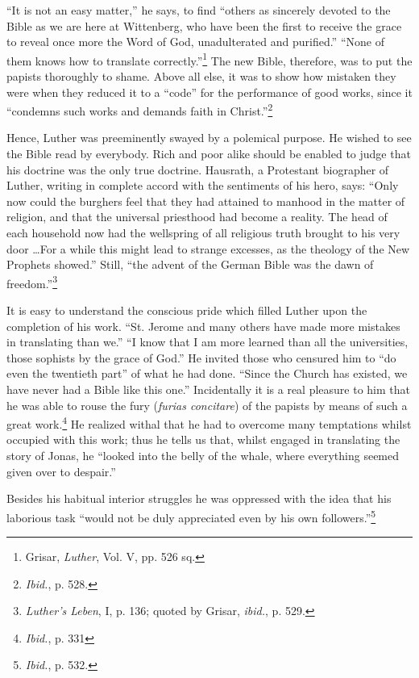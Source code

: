 “It is not an easy matter,” he says, to find “others as sincerely devoted
to the Bible as we are here at Wittenberg, who have been the first to receive
the grace to reveal once more the Word of God, unadulterated and purified.”
“None of them knows how to translate correctly.”\footnote{Grisar, \textit{Luther}, Vol. V, pp. 526 sq.}
 The new Bible, therefore,
was to put the papists thoroughly to shame. Above all else, it was to
show how mistaken they were when they reduced it to a “code” for the
performance of good works, since it “condemns such works and demands
faith in Christ.”\footnote{\textit{Ibid.}, p. 528.}

Hence, Luther was preeminently swayed by a polemical purpose. He
wished to see the Bible read by everybody. Rich and poor alike should be
enabled to judge that his doctrine was the only true doctrine. Hausrath,
a Protestant biographer of Luther, writing in complete accord with the
sentiments of his hero, says: “Only now could the burghers feel that they
had attained to manhood in the matter of religion, and that the universal
priesthood had become a reality. The head of each household now had the
wellspring of all religious truth brought to his very door \dots For a while
this might lead to strange excesses, as the theology of the New Prophets
showed.” Still, “the advent of the German Bible was the dawn of freedom.”\footnote{\textit{Luther’s Leben}, I, p. 136; quoted by Grisar, \textit{ibid.}, p. 529.}

It is easy to understand the conscious pride which filled Luther upon the
completion of his work. “St. Jerome and many others have made more mistakes
in translating than we.” “I know that I am more learned than all the
universities, those sophists by the grace of God.” He invited those who
censured him to “do even the twentieth part” of what he had done. “Since
the Church has existed, we have never had a Bible like this one.”
Incidentally it is a real pleasure to him that he was able to rouse the fury
(\textit{furias concitare}) of the papists by means of such a great work.\footnote{\textit{Ibid.}, p. 331}
He realized withal that he had to overcome many temptations whilst occupied
with this work; thus he tells us that, whilst engaged in translating
the story of Jonas, he “looked into the belly of the whale, where everything
seemed given over to despair.”

Besides his habitual interior struggles he was oppressed with the idea that
his laborious task “would not be duly appreciated even by his own followers.”\footnote{\textit{Ibid.}, p. 532.}

